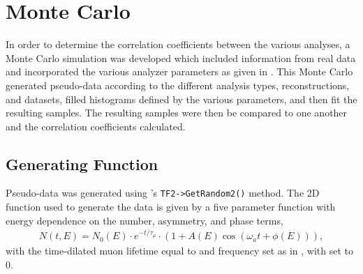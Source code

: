 
\graphicspath{{Body/Figures/EvW/}{Body/Figures/GoodnessOfFit/}{Body/Figures/Correlations/}}

\section{Monte Carlo}


In order to determine the correlation coefficients between the various analyses, a Monte Carlo simulation was developed which included information from real data and incorporated the various analyzer parameters as given in . This Monte Carlo generated pseudo-data according to the different analysis types, reconstructions, and datasets, filled histograms defined by the various parameters, and then fit the resulting samples. The resulting samples were then be compared to one another and the correlation coefficients calculated.


\subsection{Generating Function}

Pseudo-data was generated using \ROOT's \texttt{TF2->GetRandom2()} method. The 2D function used to generate the data is given by a five parameter function with energy dependence on the number, asymmetry, and phase terms,
\begin{align}
    N(t, E) = N_{0}(E) \cdot e^{-t/\tau_{\mu}} \cdot (1 + A(E) \cos{(\omega_{a}t + \phi(E))}),
\label{eq:2dfunc}
\end{align}
with the time-dilated muon lifetime \taumu equal to  and \gmtwo frequency \wa set as in , with \R set to 0. 


